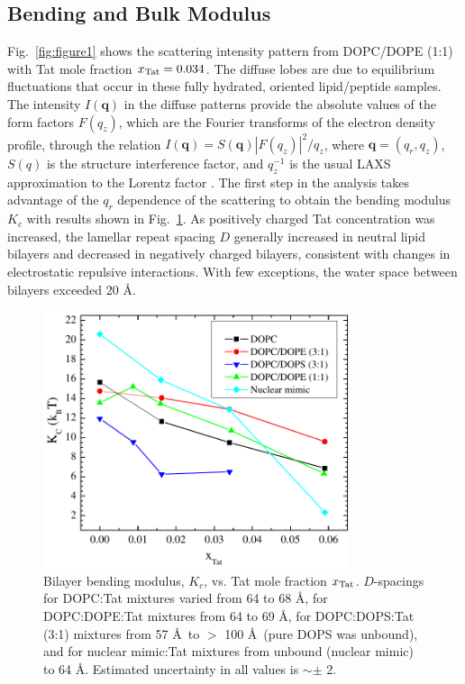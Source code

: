 \subsection{Bending and Bulk Modulus}\label{sec:Kc_results}
Fig.~\ref{fig:figure1} shows the scattering intensity pattern from 
DOPC/DOPE (1:1) with Tat mole fraction $x_\textrm{Tat}=0.034$. The diffuse lobes are 
due to equilibrium fluctuations that occur in these fully hydrated, oriented 
lipid/peptide samples. The intensity $I(\mathbf{q})$ in the diffuse 
patterns provide the absolute values of the form factors $F(q_z)$, which are 
the Fourier transforms of the electron density 
profile, through the relation $I(\mathbf{q})=S(\mathbf{q})|F(q_z)|^2/q_z$, 
where $\mathbf{q}=(q_r,q_z)$, $S(q)$ is 
the structure
interference factor, and $q_z^{-1}$ is the usual LAXS approximation to the 
Lorentz factor \cite{Kucerka05_BPJ,Kucerka06,Kucerka05_JMB}.
The first step in the analysis takes advantage of the $q_r$ dependence of the 
scattering to obtain the
bending modulus $K_c$ with results shown in Fig.~\ref{fig:figure2}. 
As positively charged Tat concentration was increased, 
the lamellar repeat spacing $D$ generally increased in neutral lipid 
bilayers and decreased in negatively charged bilayers, consistent with changes in 
electrostatic repulsive interactions. 
With few exceptions, the water space between bilayers exceeded 20 \AA.

\begin{figure}[htbp]
  \centering
  \includegraphics[width=0.8\textwidth]{figures/Tat/NFIT_results/Kc}
  \caption{Bilayer bending modulus, $K_c$, vs. Tat mole fraction $x_\textrm{Tat}$. 
  $D$-spacings for DOPC:Tat mixtures varied from 64 to 68 \AA, 
  for DOPC:DOPE:Tat mixtures from 64 to 69 \AA, 
  for DOPC:DOPS:Tat (3:1) mixtures from 57 \AA\ to $>$ 100 \AA\ (pure DOPS was unbound), 
  and for nuclear mimic:Tat mixtures from unbound (nuclear mimic) to 64 \AA. 
  Estimated uncertainty in all values is  $\sim\pm$ 2.}
  \label{fig:figure2}
\end{figure}

